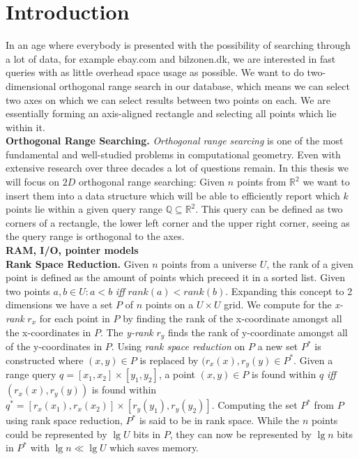 \chapter{Introduction}
\label{ch:intro}
In an age where everybody is presented with the possibility of searching through a lot of data, for example ebay.com and bilzonen.dk, we are interested in fast queries with as little overhead space usage as possible. We want to do two-dimensional orthogonal range search in our database, which means we can select two axes on which we can select results between two points on each. We are essentially forming an axis-aligned rectangle and selecting all points which lie within it.  \\

\noindent \textbf{Orthogonal Range Searching.} \emph{Orthogonal range searcing} is one of the most fundamental and well-studied problems in computational geometry. Even with extensive research over three decades a lot of questions remain. In this thesis we will focus on $2D$ orthogonal range searching: Given $n$ points from $\mathbb{R}^2$ we want to insert them into a data structure which will be able to efficiently report which $k$ points lie within a given query range $\mathbb{Q} \subseteq \mathbb{R}^2$. This query can be defined as two corners of a rectangle, the lower left corner and the upper right corner, seeing as the query range is orthogonal to the axes. \\

\noindent \textbf{RAM, I/O, pointer models} \\

\noindent \textbf{Rank Space Reduction.} Given $n$ points from a universe $U$, the rank of a given point is defined as the amount of points which preceed it in a sorted list. Given two points $a,b \in U: a < b$ \emph{iff} $rank(a) < rank(b)$. Expanding this concept to 2 dimensions we have a set $P$ of $n$ points on a $U \times U$ grid. We compute for the \emph{x-rank} $r_x$ for each point in $P$ by finding the rank of the x-coordinate amongst all the x-coordinates in $P$. The \emph{y-rank} $r_y$ finds the rank of y-coordinate amongst all of the y-coordinates in $P$. Using \emph{rank space reduction} on $P$ a new set $P^*$ is constructed where $(x,y) \in P$ is replaced by $(r_x(x), r_y(y) \in P^*$. Given a range query $q = [x_1, x_2] \times [y_1, y_2]$, a point $(x,y) \in P$ is found within $q$ \emph{iff} $(r_x(x), r_y(y))$ is found within $q^* = [r_x(x_1), r_x(x_2)] \times [r_y(y_1), r_y(y_2)]$.  Computing the set $P^*$ from $P$ using rank space reduction, $P^*$ is said to be in rank space. While the $n$ points could be represented by $\lg U$ bits in $P$, they can now be represented by $\lg n$ bits in $P^*$ with $\lg n \ll \lg U$ which saves memory.  \\

